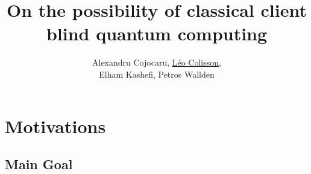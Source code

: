 \documentclass[]{beamer}
\title[QFactory and classical blind quantum computing]{On the possibility of classical client blind quantum computing}
\author[A. Cojocaru, L. Colisson, E. Kashefi, P. Wallden]{Alexandru Cojocaru, \underline{Léo Colisson},\\ Elham Kashefi, Petros Wallden}
\begin{document}

\begin{frame}
  \titlepage
\end{frame}

\begin{frame}
  \tableofcontents
\end{frame}


\section{Motivations}

\subsection{Main Goal}
\end{document}
